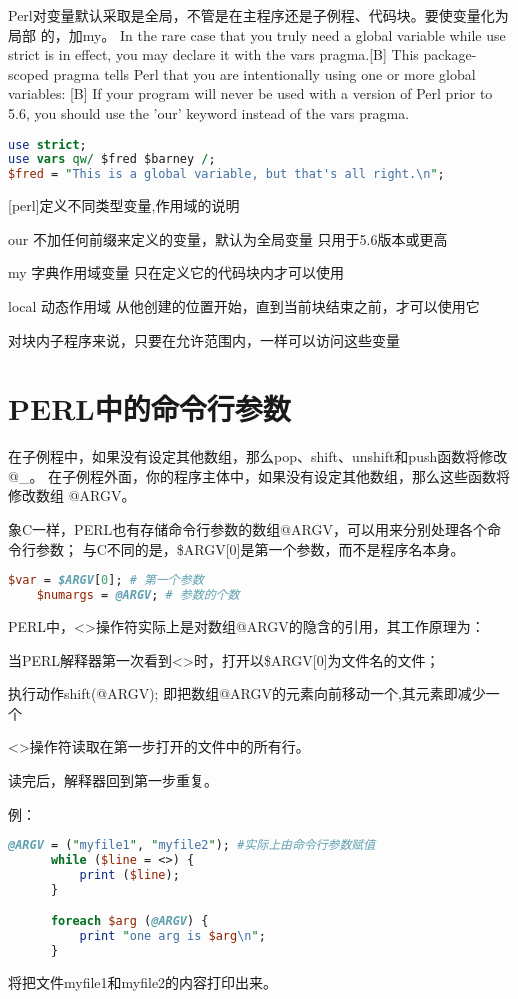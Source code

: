 \documentclass[a4paper,11pt]{book}
\begin{document}
Perl对变量默认采取是全局，不管是在主程序还是子例程、代码块。要使变量化为局部
的，加my。
In the rare case that you truly need a global variable while use strict is in
 effect, you may declare it with the vars pragma.[B] This package-scoped pragma
tells Perl that you are intentionally using one or more global variables: 
[B] If your program will never be used with a version of Perl prior to 5.6, 
you should use the 'our' keyword instead of the vars pragma.
\begin{lstlisting}[language=perl]
use strict;
use vars qw/ $fred $barney /; 
$fred = "This is a global variable, but that's all right.\n";
\end{lstlisting}
  
[perl]定义不同类型变量,作用域的说明
\begin{enumerate*}
    \item our 不加任何前缀来定义的变量，默认为全局变量 只用于5.6版本或更高
    \item my 字典作用域变量 只在定义它的代码块内才可以使用
    \item local 动态作用域 从他创建的位置开始，直到当前块结束之前，才可以使用它
    \item 对块内子程序来说，只要在允许范围内，一样可以访问这些变量 
\end{enumerate*}

\section{PERL中的命令行参数}
在子例程中，如果没有设定其他数组，那么pop、shift、unshift和push函数将修改@_。
在子例程外面，你的程序主体中，如果没有设定其他数组，那么这些函数将修改数组
@ARGV。


  象C一样，PERL也有存储命令行参数的数组@ARGV，可以用来分别处理各个命令行参数；
与C不同的是，\$ARGV[0]是第一个参数，而不是程序名本身。
\begin{lstlisting}[language=perl]
    $var = $ARGV[0]; # 第一个参数
    $numargs = @ARGV; # 参数的个数
\end{lstlisting}
    
PERL中，<>操作符实际上是对数组@ARGV的隐含的引用，其工作原理为：
\begin{enumerate*}
    \item 当PERL解释器第一次看到<>时，打开以\$ARGV[0]为文件名的文件；
    \item 执行动作shift(@ARGV); 即把数组@ARGV的元素向前移动一个,其元素即减少一个
    \item <>操作符读取在第一步打开的文件中的所有行。
    \item 读完后，解释器回到第一步重复。
\end{enumerate*}
  例：
  \begin{lstlisting}[language=perl]
      @ARGV = ("myfile1", "myfile2"); #实际上由命令行参数赋值
      while ($line = <>) {
          print ($line);
      } 

      foreach $arg (@ARGV) {
          print "one arg is $arg\n";
      }
  \end{lstlisting}
  将把文件myfile1和myfile2的内容打印出来。
  
\end{document}
